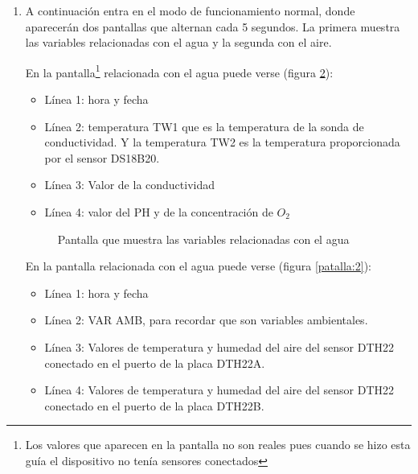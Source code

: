 \begin{enumerate}
Esta tarea requiere cierto tiempo porque lo intentará 5 veces. Durante el funcionamiento normal del dispositivo, cada vez que intente mandar un dato, chequeará el servidor MQTT y si no hay conexión, volverá a intentar conectarse 5 veces.

En caso de que que se conecte, aparecerá pantalla (figura \ref{patalla:mqttOK}). Además se encenderá el led con la etiqueta \emph{MQTT} de la figura \ref{botones}.

\begin{figure}[htbp!] 
\caption{Éxito al conectarse al sevidor mqtt}\label{patalla:mqttOK} 
\end{figure}


\item A continuación entra en el modo de funcionamiento normal, donde aparecerán dos pantallas que alternan cada 5 segundos. La primera muestra las variables relacionadas con el agua y la segunda con el aire.

En la pantalla\footnote{Los valores que aparecen en la pantalla no son reales pues cuando se hizo esta guía el dispositivo no tenía sensores conectados} relacionada con el agua puede verse (figura \ref{patalla:1}):
\begin{itemize}
\item Línea 1: hora y fecha
\item Línea 2: temperatura TW1 que es la temperatura de la sonda de conductividad. Y la temperatura TW2 es la temperatura proporcionada por el sensor DS18B20.
\item Línea 3: Valor de la conductividad
\item Línea 4: valor del PH y de la concentración de $O_2$
\end{itemize}

\begin{figure}[htbp!] 
\caption{Pantalla que muestra las variables relacionadas con el agua}\label{patalla:1} 
\end{figure}

En la pantalla relacionada con el agua puede verse (figura \ref{patalla:2}):
\begin{itemize}
\item Línea 1: hora y fecha
\item Línea 2: VAR AMB, para recordar que son variables ambientales.
\item Línea 3: Valores de temperatura y humedad del aire del sensor DTH22 conectado en el puerto de la placa DTH22A.
\item Línea 4: Valores de temperatura y humedad del aire del sensor DTH22 conectado en el puerto de la placa DTH22B.
\end{itemize}


\end{enumerate}
